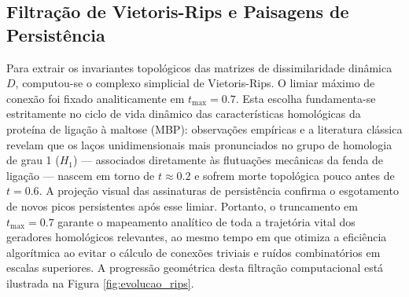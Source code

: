 \documentclass[12pt, a4paper]{article}
\theoremstyle{plain}
\theoremstyle{definition}
\theoremstyle{remark}
\newcommand{\ident}{\hspace{2em}}
\begin{document}
\subsection{Filtração de Vietoris-Rips e Paisagens de Persistência}

\ident Para extrair os invariantes topológicos das matrizes de dissimilaridade dinâmica $D$, computou-se o complexo simplicial de Vietoris-Rips. O limiar máximo de conexão foi fixado analiticamente em $t_{\max} = 0.7$. Esta escolha fundamenta-se estritamente no ciclo de vida dinâmico das características homológicas da proteína de ligação à maltose (MBP): observações empíricas e a literatura clássica \cite{kovacev2016} revelam que os laços unidimensionais mais pronunciados no grupo de homologia de grau 1 ($H_1$) — associados diretamente às flutuações mecânicas da fenda de ligação — nascem em torno de $t \approx 0.2$ e sofrem morte topológica pouco antes de $t = 0.6$. A projeção visual das assinaturas de persistência confirma o esgotamento de novos picos persistentes após esse limiar. Portanto, o truncamento em $t_{\max} = 0.7$ garante o mapeamento analítico de toda a trajetória vital dos geradores homológicos relevantes, ao mesmo tempo em que otimiza a eficiência algorítmica ao evitar o cálculo de conexões triviais e ruídos combinatórios em escalas superiores. A progressão geométrica desta filtração computacional está ilustrada na Figura \ref{fig:evolucao_rips}.
\end{document}
